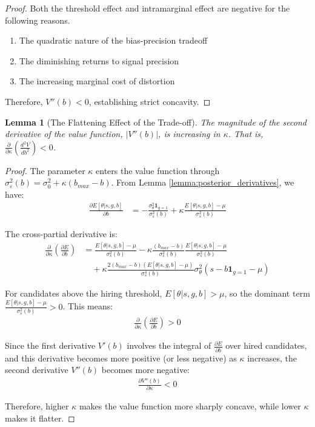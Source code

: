 \documentclass[12pt,a4paper]{article}
\newtheorem{lemma}{Lemma}
\theoremstyle{definition}
\theoremstyle{remark}
\begin{document}
\begin{proof}
Both the threshold effect and intramarginal effect are negative for the following reasons.
\begin{enumerate}
    \item The quadratic nature of the bias-precision tradeoff
    \item The diminishing returns to signal precision
    \item The increasing marginal cost of distortion
\end{enumerate}

Therefore, $V''(b) < 0$, establishing strict concavity.
\end{proof}


\begin{lemma}[The Flattening Effect of the Trade-off]
    \label{lemma:flattening}
    The magnitude of the second derivative of the value function, $|V''(b)|$, is increasing in $\kappa$. That is, $\frac{\partial}{\partial \kappa} \left( \frac{d^2V}{db^2} \right) < 0$.
\end{lemma}

\begin{proof}
The parameter $\kappa$ enters the value function through $\sigma_\varepsilon^2(b) = \sigma_0^2 + \kappa(b_{max}-b)$. From Lemma \ref{lemma:posterior_derivatives}, we have:
\begin{align}
\frac{\partial E[\theta | s, g, b]}{\partial b} &= -\frac{\sigma_\theta^2 \mathbf{1}_{g=1}}{\sigma_s^2(b)} + \kappa \frac{E[\theta|s,g,b] - \mu}{\sigma_s^2(b)}
\end{align}

The cross-partial derivative is:
\begin{align}
\frac{\partial}{\partial \kappa} \left( \frac{\partial E}{\partial b} \right) &= \frac{E[\theta|s,g,b] - \mu}{\sigma_s^2(b)} - \kappa \frac{(b_{max}-b)}{\sigma_s^2(b)} \frac{E[\theta|s,g,b] - \mu}{\sigma_s^2(b)} \\
&\quad + \kappa \frac{2(b_{max}-b)(E[\theta|s,g,b] - \mu)}{\sigma_s^4(b)} \sigma_\theta^2 (s - b\mathbf{1}_{g=1} - \mu)
\end{align}

For candidates above the hiring threshold, $E[\theta|s,g,b] > \mu$, so the dominant term $\frac{E[\theta|s,g,b] - \mu}{\sigma_s^2(b)} > 0$. This means:
\begin{align}
\frac{\partial}{\partial \kappa} \left( \frac{\partial E}{\partial b} \right) > 0
\end{align}

Since the first derivative $V'(b)$ involves the integral of $\frac{\partial E}{\partial b}$ over hired candidates, and this derivative becomes more positive (or less negative) as $\kappa$ increases, the second derivative $V''(b)$ becomes more negative:
\begin{align}
\frac{\partial V''(b)}{\partial \kappa} < 0
\end{align}

Therefore, higher $\kappa$ makes the value function more sharply concave, while lower $\kappa$ makes it flatter.
\end{proof}
\end{document}
